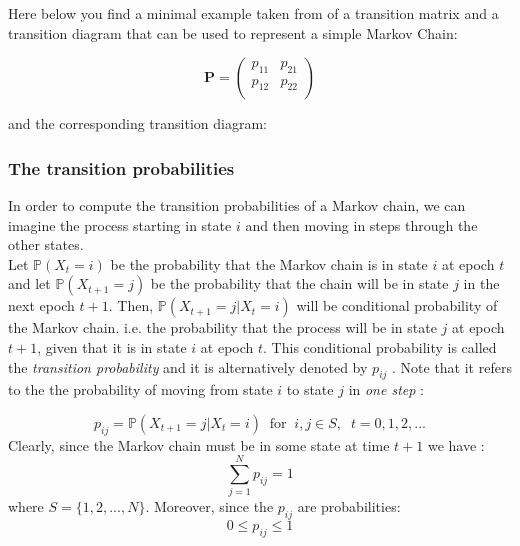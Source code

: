 \documentclass[\main/main.tex]{subfiles}
\begin{document}
\noindent Here below you find a minimal example taken from \cite{Sheskin2010} of a transition matrix and a transition diagram that can be used to represent a simple Markov Chain:

\begin{equation}
   \mathbf{P} =
   \begin{pmatrix}
   p_{11} & p_{21} \\ 
p_{12}& p_{22} \\ 
   \end{pmatrix}
\end{equation}

and the corresponding transition diagram:\\
\begin{center} 
\end{center}






\subsubsection{The transition probabilities}
In order to compute the transition probabilities of a Markov chain, we can imagine the process starting in state $i$ and then moving in steps through the other states. \\
Let $\mathds{P}(X_t = i)$ be the probability that the Markov chain is in state $i$ at epoch $t$ and let $\mathds{P}(X_{t+1} = j)$ be the probability that the chain will be in state $j$ in the next epoch $t+1$. Then, $\mathds{P}(X_{t+1}
= j|X_{t} = i)$ will be conditional probability of the Markov chain. i.e. the probability that the process will be in state $j$ at epoch $t + 1$, given that it is in state $i$ at epoch $t$. 
This conditional probability is called the \textit{transition probability} and it is alternatively denoted by $p_{ij}$ \citep{Sheskin2010}. Note that it refers to the the probability of moving from state $i$ to state $j$ in \textit{one step}  :

\begin{equation}
    p_{ij} = \mathds{P}(X_{t+1} = j |X_t = i) \; \; \text{for}\; \; i,j \in S, \; \; t=0,1,2,...
\end{equation}
Clearly, since the Markov chain must be in some state at time $t+1$ we have \citep{Howard1960}:
\begin{equation}
 \sum_{j=1}^N     p_{ij} = 1
\end{equation}
where $S=\{1,2,...,N\} $. Moreover, since the $p_{ij}$ are probabilities:
\begin{equation}
 0 \leq p_{ij} \leq 1
\end{equation}\\
\end{document}
